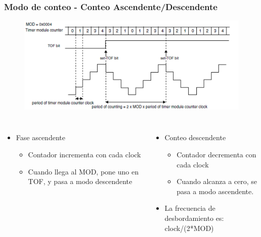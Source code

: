 \documentclass[10.5pt,scale=1.0,t,aspectratio=169,hyperref={pdfpagelabels=false}]{beamer}
\begin{document}
\begin{frame}
	\frametitle{Modo de conteo - Conteo Ascendente/Descendente}
	\vspace{-0.3cm}
	{\footnotesize
		\begin{figure}
			\centering
			\includegraphics[scale=0.65]{08_CountingUpDown}
		\end{figure}
		
		\begin{columns}
			\begin{itemize}
				\item Fase ascendente
				\begin{itemize}
					\item Contador incrementa con cada clock
					\item Cuando llega al MOD, pone uno en TOF, y pasa a modo descendente
				\end{itemize}
			\end{itemize}
			
			\begin{itemize}
				\item Conteo descendente
				\begin{itemize}
					\item Contador decrementa con cada clock
					\item Cuando alcanza a cero, se pasa a modo ascendente.
				\end{itemize}
				\item La frecuencia de desbordamiento es: clock/(2*MOD)
			\end{itemize}
			
		\end{columns}
	}
\end{frame}
\end{document}
